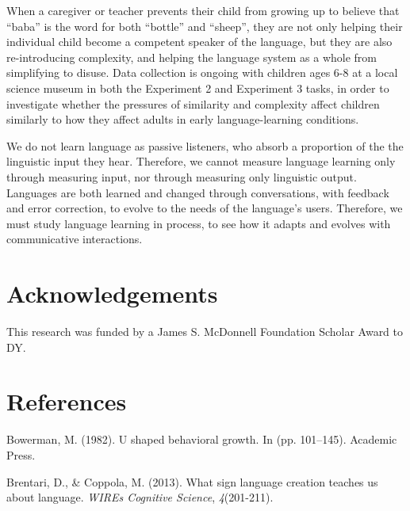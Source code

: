 \documentclass[10pt, letterpaper]{article}
\begin{document}
When a caregiver or teacher prevents their child from growing up to
believe that ``baba'' is the word for both ``bottle'' and ``sheep'',
they are not only helping their individual child become a competent
speaker of the language, but they are also re-introducing complexity,
and helping the language system as a whole from simplifying to disuse.
Data collection is ongoing with children ages 6-8 at a local science
museum in both the Experiment 2 and Experiment 3 tasks, in order to
investigate whether the pressures of similarity and complexity affect
children similarly to how they affect adults in early language-learning
conditions.

We do not learn language as passive listeners, who absorb a proportion
of the the linguistic input they hear. Therefore, we cannot measure
language learning only through measuring input, nor through measuring
only linguistic output. Languages are both learned and changed through
conversations, with feedback and error correction, to evolve to the
needs of the language's users. Therefore, we must study language
learning in process, to see how it adapts and evolves with communicative
interactions.

\vspace{1em}

\section{Acknowledgements}\label{acknowledgements}

This research was funded by a James S. McDonnell Foundation Scholar
Award to DY.

\section{References}\label{references}

\setlength{\parindent}{-0.1in} \setlength{\leftskip}{0.125in}

\noindent

\hypertarget{refs}{}
\hypertarget{ref-bowerman-1982}{}
Bowerman, M. (1982). U shaped behavioral growth. In (pp. 101--145).
Academic Press.

\hypertarget{ref-brentari-2013}{}
Brentari, D., \& Coppola, M. (2013). What sign language creation teaches
us about language. \emph{WIREs Cognitive Science}, \emph{4}(201-211).
\end{document}
